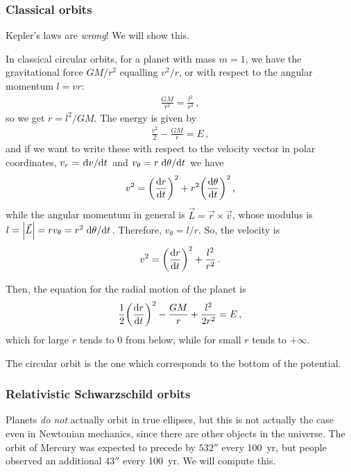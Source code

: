 \documentclass[main.tex]{subfiles}
\begin{document}
\subsubsection{Classical orbits}

Kepler's laws are \emph{wrong}! We will show this.

In classical circular orbits, for a planet with mass \(m=1\), we have the gravitational force \(GM/r^2\) equalling \(v^2/r\), or with respect to the angular momentum \(l = vr\): 
%
\begin{align}
  \frac{GM}{r^2} = \frac{l^2}{r^3}
\,,
\end{align}
%
so we get \(r = l^2/GM\). The energy is given by 
%
\begin{align}
  \frac{v^2}{2} - \frac{GM}{r} = E
\,,
\end{align}
%
and if we want to write these with respect to the velocity vector in polar coordinates, \(v_r = \dv*{v}{t}\) and \(v_\theta = r \dv*{\theta }{t}\) we have 
%
\begin{align}
  v^2 = \qty(\dv{r}{t})^2 + r^2 \qty(\dv{\theta }{t})^2
\,,
\end{align}
%
while the angular momentum in general is \(\vec{L} = \vec{r} \times \vec{v}\), whose modulus is \(l = \abs{\vec{L}} = r v_{\theta } = r^2 \dv*{\theta }{t}\).
Therefore, \(v_{\theta } = l/r\). So, the velocity is 
%
\begin{align}
  v^2= \qty(\dv{r}{t})^2 + \frac{l^2}{r^2}
\,.
\end{align}

Then, the equation for the radial motion of the planet is 
%
\begin{align}
  \frac{1}{2} \qty(\dv{r}{t})^2 - \frac{GM}{r} + \frac{l^2}{2r^2} = E
\,,
\end{align}
%
which for large \(r\) tends to 0 from below, while for small \(r\) tends to \(+ \infty\).

The circular orbit is the one which corresponds to the bottom of the potential.

\subsubsection{Relativistic Schwarzschild orbits}

Planets \emph{do not} actually orbit in true ellipses, but this is not actually the case even in Newtonian mechanics, since there are other objects in the universe.
The orbit of Mercury was expected to precede by \(532''\) every \SI{100}{yr}, but people observed an additional \(43''\) every \SI{100}{yr}.
We will compute this.
\end{document}
